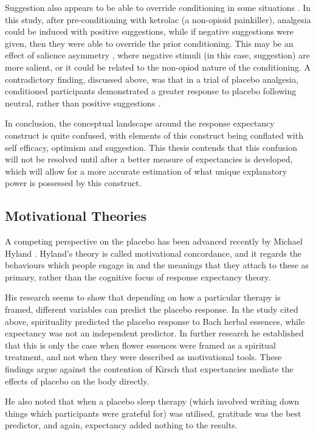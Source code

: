 Suggestion also appears to be able to override conditioning in some situations \cite{Benedetti2008}. In this study, after pre-conditioning with ketrolac (a non-opioid painkiller), analgesia could be induced with positive suggestions, while if negative suggestions were given, then they were able to override the prior conditioning. This may be an effect of salience asymmetry \cite{Rothermund2004}, where negative stimuli (in this case, suggestion) are more salient, or it could be related to the non-opiod nature of the conditioning. A contradictory finding, discussed above, was that in a trial of placebo analgesia, conditioned participants demonstrated a greater response to placebo following neutral, rather than positive suggestions \cite{Klinger2007a}. 

In conclusion, the conceptual landscape around the response expectancy construct is quite confused, with elements of this construct being conflated with self efficacy, optimism and suggestion. This thesis contends that this confusion will not be resolved until after a better measure of expectancies is developed, which will allow for a more accurate estimation of what unique explanatory power is possessed by this construct. 

\subsection{Motivational Theories}
\label{sec:behav-plac-motiv}

A competing perspective on the placebo has been advanced recently by Michael Hyland \cite{Hyland2006}. Hyland's theory is called motivational concordance, and it regards the behaviours which people engage in and the meanings that they attach to these as primary,  rather than the cognitive focus of response expectancy theory.  

His research seems to show that depending on how a particular therapy is framed, different variables can predict the placebo response.  In the study cited above, spirituality predicted the placebo response to Bach herbal essences, while expectancy was not an independent predictor. In further research \cite{Hyland2007} he established that this is only the case when flower essences were framed as a spiritual treatment, and not when they were described as motivational tools. These findings argue against the contention of Kirsch that expectancies mediate the effects of placebo on the body directly. 

He also noted that when a placebo sleep therapy (which involved writing down things which participants were grateful for) was utilised, gratitude was the best predictor, and again, expectancy added nothing to the results. 

